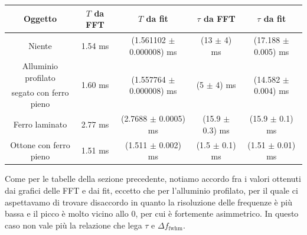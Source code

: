 \documentclass{article}[a4paper, oneside,11pt]
\begin{document}
\begin{center}
    \begin{tabular}{|c||c|c||c|c|}
    \hline
        Oggetto & $T$ da FFT & $T$ da fit & $\tau$ da FFT & $\tau$ da fit\\
    \hline\hline
        Niente & 1.54 ms & (1.561102 $\pm$ 0.000008) ms & (13 $\pm$ 4) ms & (17.188 $\pm$ 0.005) ms\\
    \hline
        Alluminio profilato  & \multirow{2}{*}{1.60 ms} & \multirow{2}{*}{(1.557764 $\pm$ 0.000008) ms} & \multirow{2}{*}{(5 $\pm$ 4) ms} & \multirow{2}{*}{(14.582 $\pm$ 0.004) ms}\\
        segato con ferro pieno & & & &\\
    \hline
        Ferro laminato & 2.77 ms & (2.7688 $\pm$ 0.0005) ms & (15.9 $\pm$ 0.3) ms & (15.9 $\pm$ 0.1) ms\\
    \hline
        Ottone con ferro pieno & 1.51 ms & (1.511 $\pm$ 0.002) ms & (1.5 $\pm$ 0.1) ms & (1.51 $\pm$ 0.01) ms\\
    \hline
    \end{tabular}
\end{center}
Come per le tabelle della sezione precedente, notiamo accordo fra i valori ottenuti dai grafici delle FFT e dai fit, eccetto che per l'alluminio profilato, per il quale ci aspettavamo di trovare disaccordo in quanto la risoluzione delle frequenze è più bassa e il picco è molto vicino allo 0, per cui è fortemente asimmetrico. In questo caso non vale più la relazione che lega $\tau$ e $\Delta f_{\text{fwhm}}$.
\end{document}
